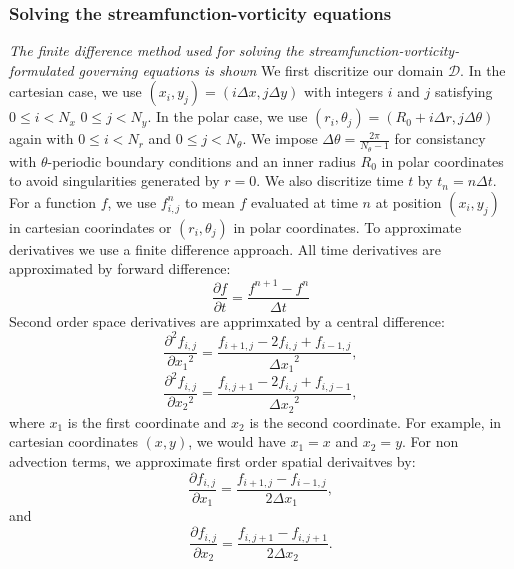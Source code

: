 \documentclass{article}
\begin{document}
\subsubsection*{Solving the streamfunction-vorticity equations}
{\it{The finite difference method used for solving the streamfunction-vorticity-formulated governing equations is shown}}
\vspace{0.3cm}
\newline
\noindent We first discritize our domain $\mathcal{D}$. In the cartesian case, we use $(x_i,y_j)=(i \Delta x, j \Delta y)
$ with integers $i$ and $j$ satisfying $0\leq i < N_x$ $0 \leq j < N_y$. In the polar case, we use $(r_i, \theta_j)= (R_0 
+ i \Delta r, j 
\Delta \theta)$ again with  $0 \leq i < N_r$ and $0 \leq j < N_{\theta}$. We impose $\Delta \theta = \frac{2 \pi}
{N_{\theta} - 1}$ for consistancy with $\theta$-periodic boundary conditions and an inner radius $R_0$ in polar 
coordinates to avoid 
singularities generated by $r=0$. We also discritize time $t$ by $t_n = n \Delta t$. For a function $f$, we use 
$f^n_{i,j}$ to mean $f$ evaluated at time $n$ at position $(x_i,y_j)$ in cartesian coorindates or $(r_i, \theta_j)$ in 
polar coordinates. 
\newline
To approximate derivatives we use a finite difference approach. All time derivatives are approximated by forward difference:
\begin{equation}
	\frac{\partial f}{\partial t} = \frac{f^{n+1} - f^{n}}{\Delta t}
	\label{forward time difference}
\end{equation}
Second order space derivatives are apprimxated by a central difference:
\begin{equation}
	\frac{\partial^2 f_{i,j}}{\partial {x_1}^2} = \frac{f_{i+1,j} - 2 f_{i,j} + f_{i-1,j}}{{\Delta x_1}^2},
\end{equation}
\begin{equation}
	\frac{\partial^2 f_{i,j}}{\partial {x_2}^2} = \frac{f_{i,j+1} - 2 f_{i,j} + f_{i,j-1}}{{\Delta x_2}^2},
\end{equation}
where $x_1$ is the first coordinate and $x_2$ is the second coordinate. For example, in cartesian coordinates $(x,y)$, we would have $x_1=x$ and $x_2=y$. 
For non advection terms, we approximate first order spatial derivaitves by:
\begin{equation}
	\frac{\partial f_{i,j}}{\partial x_1} = \frac{f_{i+1,j} - f_{i-1,j}}{2{\Delta x_1}},
\end{equation}
and
\begin{equation}
	\frac{\partial f_{i,j}}{\partial x_2} = \frac{f_{i,j+1} - f_{i,j+1}}{2{\Delta x_2}}.
\end{equation}
\end{document}
